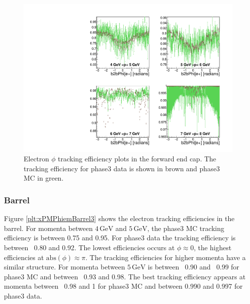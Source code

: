\documentclass[a4paper,11pt,twosided,final,german,openbib,pdftex,listof=totoc,bibliography=totoc]{scrbook}
\begin{document}
\begin{figure}[!htbp]
	\centering
	\includegraphics[width=\textwidth]{Plots/master3/xPMPhiemFCP3}
	\caption[Momentum $\phi$ Electron Forward End Cap Efficiency Phase3]{Electron $\phi$ tracking efficiency plots in the forward end cap. The tracking efficiency for phase3 data is shown in brown and phase3 MC in green.}
	\label{plt:xPMPhiemFC3}
\end{figure}



\newpage
\subsubsection{Barrel}

Figure \ref{plt:xPMPhiemBarrel3} shows the electron tracking efficiencies in the barrel.
For momenta between $4\,\textrm{GeV}$ and $5\,\textrm{GeV}$, the phase3 MC tracking efficiency is between 0.75 and 0.95. For phase3 data the tracking efficiency is between ~0.80 and 0.92. The lowest efficiencies occurs at $\phi \approx 0$, the highest efficiencies at $\textrm{abs}(\phi) \approx \pi$.
The tracking efficiencies for higher momenta have a similar structure. 
For momenta between $5\,\textrm{GeV}$ is between ~0.90 and ~0.99 for phase3 MC and between ~0.93 and 0.98. The best tracking efficiency appears at momenta between ~0.98 and 1 for phase3 MC and between 0.990 and 0.997 for phase3 data.
\end{document}

